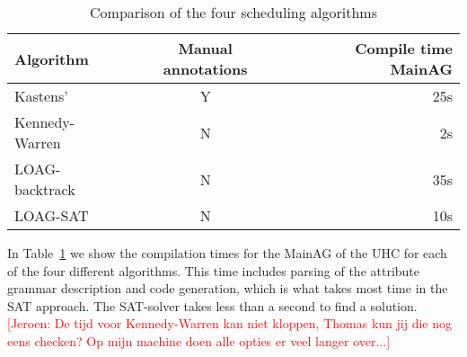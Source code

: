 \documentclass{llncs}
\newif\iffinal\finalfalse
\newcommand{\REM}[3]{\iffinal\else\textcolor{#2}{[#1: #3]}\fi}
\newcommand{\Jeroen}[1]{\REM{Jeroen}{red}{#1}}
\newcommand{\tabref}[1]{Table~\ref{#1}}
\begin{document}
\begin{table}
  \begin{center}
    \begin{tabular}{l || c || r}
      Algorithm   &   Manual annotations   &  Compile time MainAG \\
      \hline
      Kastens'                &   Y           &   25s \\
      Kennedy-Warren  &   N           &   2s \\
      LOAG-backtrack  &   N           &   35s \\
      LOAG-SAT           &   N           &   10s \\
    \end{tabular}
  \end{center}
  \caption{Comparison of the four scheduling algorithms}
  \label{tab:algo-comparison}
\end{table}

In \tabref{tab:algo-comparison} we show the compilation times for the MainAG of the UHC for each of the four different algorithms. This time includes parsing of the attribute grammar description and code generation, which is what takes most time in the SAT approach. The SAT-solver takes less than a second to find a solution. \Jeroen{De tijd voor Kennedy-Warren kan niet kloppen, Thomas kun jij die nog eens checken? Op mijn machine doen alle opties er veel langer over...}
\end{document}
